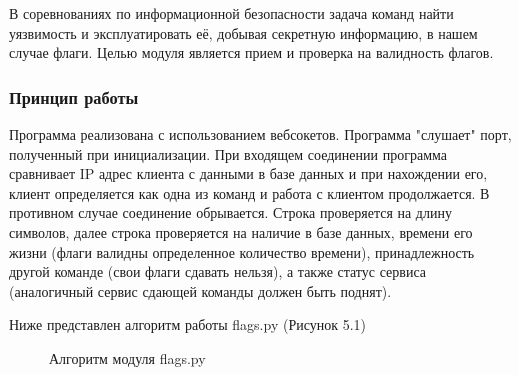 В соревнованиях по информационной безопасности задача команд найти уязвимость и эксплуатировать её, добывая секретную информацию, в нашем случае флаги. Целью модуля является прием и проверка на валидность флагов.

\subsubsection{Принцип работы}

Программа реализована с использованием вебсокетов. Программа "слушает" порт, полученный при инициализации. При входящем соединении программа сравнивает IP адрес клиента с данными в базе данных и при нахождении его, клиент определяется как одна из команд и работа с клиентом продолжается. В противном случае соединение обрывается. Строка проверяется на длину символов, далее строка проверяется на наличие в базе данных, времени его жизни (флаги валидны определенное количество времени), принадлежность другой команде (свои флаги сдавать нельзя), а также статус сервиса (аналогичный сервис сдающей команды должен быть поднят). 

Ниже представлен алгоритм работы flags.py (Рисунок 5.1)

\begin{figure}[ht!]
\caption{Алгоритм модуля flags.py}
\end{figure} 

\clearpage
